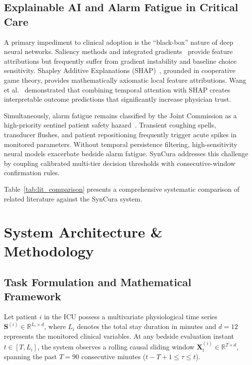 \documentclass[conference]{IEEEtran}
\begin{document}
\subsection{Explainable AI and Alarm Fatigue in Critical Care}
A primary impediment to clinical adoption is the ``black-box'' nature of deep neural networks. Saliency methods and integrated gradients~\cite{zheng2025} provide feature attributions but frequently suffer from gradient instability and baseline choice sensitivity. Shapley Additive Explanations (SHAP)~\cite{lundberg2017}, grounded in cooperative game theory, provides mathematically axiomatic local feature attributions. Wang et al.~\cite{wang2026} demonstrated that combining temporal attention with SHAP creates interpretable outcome predictions that significantly increase physician trust. 

Simultaneously, alarm fatigue remains classified by the Joint Commission as a high-priority sentinel patient safety hazard~\cite{sendelbach2013}. Transient coughing spells, transducer flushes, and patient repositioning frequently trigger acute spikes in monitored parameters. Without temporal persistence filtering, high-sensitivity neural models exacerbate bedside alarm fatigue. SynCura addresses this challenge by coupling calibrated multi-tier decision thresholds with consecutive-window confirmation rules.

Table~\ref{tab:lit_comparison} presents a comprehensive systematic comparison of related literature against the SynCura system.

\section{System Architecture \& Methodology}

\subsection{Task Formulation and Mathematical Framework}
Let patient $i$ in the ICU possess a multivariate physiological time series $\mathbf{S}^{(i)} \in \mathbb{R}^{L_i \times d}$, where $L_i$ denotes the total stay duration in minutes and $d=12$ represents the monitored clinical variables. At any bedside evaluation instant $t \in [T, L_i]$, the system observes a rolling causal sliding window $\mathbf{X}_t^{(i)} \in \mathbb{R}^{T \times d}$, spanning the past $T=90$ consecutive minutes ($t - T + 1 \le \tau \le t$).
\end{document}
